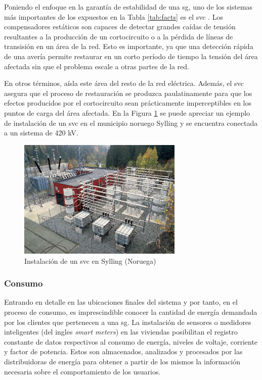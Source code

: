 \vspace{3mm}

Poniendo el enfoque en la garantía de estabilidad de una \gls{sg}, uno de los sistemas más importantes de los expuestos en la Tabla \ref{tab:facts} es el \gls{svc} \cite{facts}. Los compensadores estáticos son capaces de detectar grandes caídas de tensión resultantes a la producción de un cortocircuito o a la pérdida de líneas de transisión en un área de la red. Esto es importante, ya que una detección rápida de una avería permite restaurar en un corto período de tiempo la tensión del área afectada sin que el problema escale a otras partes de la red. 

\vspace{3mm}

En otros términos, aísla este área del resto de la red eléctrica. Además, el \gls{svc} asegura que el proceso de restauración se produzca paulatinamente para que los efectos producidos por el cortocircuito sean prácticamente imperceptibles en los puntos de carga del área afectada. En la Figura \ref{fig:svc} se puede apreciar un ejemplo de instalación de un \gls{svc} en el municipio noruego Sylling y se encuentra conectada a un sistema de 420 kV.

\vspace{3mm}

\begin{figure}[h]
  \centering
  \includegraphics[width=0.7\textwidth]{img/teoria/svc.png}
  \caption{Instalación de un \gls{svc} en Sylling (Noruega) \cite{facts}}
  \label{fig:svc}
\end{figure}

\subsubsection{Consumo}
\label{sec:consumo}

Entrando en detalle en las ubicaciones finales del sistema y por tanto, en el proceso de consumo, es imprescindible conocer la cantidad de energía demandada por los clientes que pertenecen a una \gls{sg}. La instalación de sensores o medidores inteligentes (del ingles \textit{smart meters}) en las viviendas posibilitan el registro constante de datos respectivos al consumo de energía, niveles de voltaje, corriente y factor de potencia. Estos son almacenados, analizados y procesados por las distribuidoras de energía para obtener a partir de los mismos la información necesaria sobre el comportamiento de los usuarios. \cite{stab}

